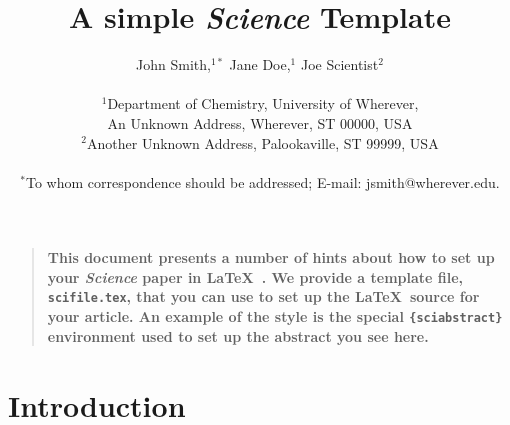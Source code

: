 \documentclass[12pt]{article}
\title{A simple {\it Science\/} Template}
\author
{John Smith,$^{1\ast}$ Jane Doe,$^{1}$ Joe Scientist$^{2}$\\
	\\
	\normalsize{$^{1}$Department of Chemistry, University of Wherever,}\\
	\normalsize{An Unknown Address, Wherever, ST 00000, USA}\\
	\normalsize{$^{2}$Another Unknown Address, Palookaville, ST 99999, USA}\\
	\\
	\normalsize{$^\ast$To whom correspondence should be addressed; E-mail:  jsmith@wherever.edu.}
}
\date{}
\newenvironment{sciabstract}{%
	\begin{quote} \bf}
	{\end{quote}}
\begin{document}
 
	
	
	\baselineskip24pt
	
	
	\maketitle 
	
	
	
	
	\begin{sciabstract}
		This document presents a number of hints about how to set up your
		{\it Science\/} paper in \LaTeX\ .  We provide a template file,
		\texttt{scifile.tex}, that you can use to set up the \LaTeX\ source
		for your article.  An example of the style is the special
		\texttt{\{sciabstract\}} environment used to set up the abstract you
		see here.
	\end{sciabstract}
	
	
	
	
	\section*{Introduction}
	
\end{document}
